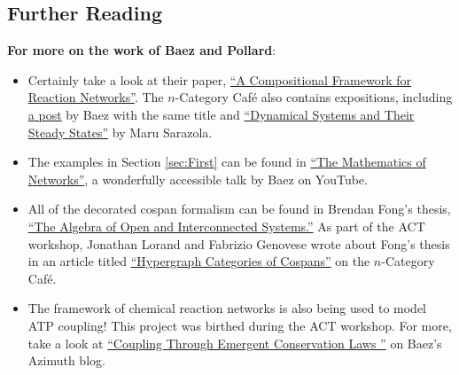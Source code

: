 \documentclass{tufte-handout-tai}
\theoremstyle{plain}
\theoremstyle{definition}
\theoremstyle{remark}
\begin{document}
\newpage
\subsection{Further Reading}\label{ssec:furtherreading3}

\textbf{For more on the work of Baez and Pollard}: 
\begin{itemize}
\item Certainly take a look at their paper, \href{https://arxiv.org/abs/1704.02051}{``A Compositional Framework for Reaction Networks''}. The $n$-Category Caf{\'e} also contains expositions, including \href{https://golem.ph.utexas.edu/category/2017/07/a\_compositional\_framework\_for\_2.html}{a post} by Baez with the same title and \href{https://golem.ph.utexas.edu/category/2018/04/dynamical\_systems\_and\_their\_st.html}{``Dynamical Systems and Their Steady States''} by Maru Sarazola.

\item The examples in Section \ref{sec:First} can be found in \href{https://www.youtube.com/watch?v=IyJP_7ucwWo}{``The Mathematics of Networks''}, a wonderfully accessible talk by Baez on YouTube. 

\item All of the decorated cospan formalism can be found in Brendan Fong's thesis, \href{https://arxiv.org/abs/1609.05382}{``The Algebra of Open and Interconnected Systems.''} As part of the ACT workshop, Jonathan Lorand and Fabrizio Genovese wrote about Fong's thesis in an article titled \href{https://golem.ph.utexas.edu/category/2018/02/hypergraph\_categories\_of\_cospa.html}{``Hypergraph Categories of Cospans''} on the $n$-Category Caf{\'e}.
\item The framework of chemical reaction networks is also being used to model ATP coupling! This project was birthed during the ACT workshop. For more, take a look at  \href{https://johncarlosbaez.wordpress.com/2018/06/27/coupling-through-emergent-conservation-laws-part-1}{``Coupling Through Emergent Conservation Laws ''} on Baez's Azimuth blog.
\end{itemize}
\end{document}
